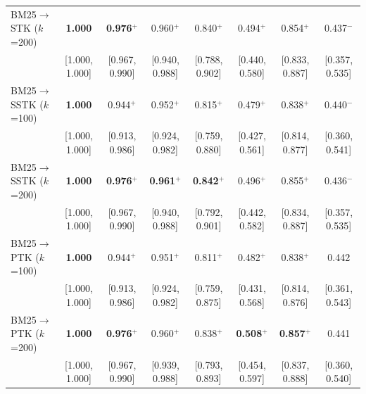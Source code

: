 \begin{table}[!htbp]
\begin{tabular}{lccccccc}
\quad BM25$\rightarrow$STK ($k$=200) & \textbf{1.000} & \textbf{0.976}$^{+}$ & 0.960$^{+}$ & 0.840$^{+}$ & 0.494$^{+}$ & 0.854$^{+}$ & 0.437$^{-}$ \\
 & [1.000, 1.000] & [0.967, 0.990] & [0.940, 0.988] & [0.788, 0.902] & [0.440, 0.580] & [0.833, 0.887] & [0.357, 0.535] \\[2pt]
\quad BM25$\rightarrow$SSTK ($k$=100) & \textbf{1.000} & 0.944$^{+}$ & 0.952$^{+}$ & 0.815$^{+}$ & 0.479$^{+}$ & 0.838$^{+}$ & 0.440$^{-}$ \\
 & [1.000, 1.000] & [0.913, 0.986] & [0.924, 0.982] & [0.759, 0.880] & [0.427, 0.561] & [0.814, 0.877] & [0.360, 0.541] \\[2pt]
\quad BM25$\rightarrow$SSTK ($k$=200) & \textbf{1.000} & \textbf{0.976}$^{+}$ & \textbf{0.961}$^{+}$ & \textbf{0.842}$^{+}$ & 0.496$^{+}$ & 0.855$^{+}$ & 0.436$^{-}$ \\
 & [1.000, 1.000] & [0.967, 0.990] & [0.940, 0.988] & [0.792, 0.901] & [0.442, 0.582] & [0.834, 0.887] & [0.357, 0.535] \\[2pt]
\quad BM25$\rightarrow$PTK ($k$=100) & \textbf{1.000} & 0.944$^{+}$ & 0.951$^{+}$ & 0.811$^{+}$ & 0.482$^{+}$ & 0.838$^{+}$ & 0.442 \\
 & [1.000, 1.000] & [0.913, 0.986] & [0.924, 0.982] & [0.759, 0.875] & [0.431, 0.568] & [0.814, 0.876] & [0.361, 0.543] \\[2pt]
\quad BM25$\rightarrow$PTK ($k$=200) & \textbf{1.000} & \textbf{0.976}$^{+}$ & 0.960$^{+}$ & 0.838$^{+}$ & \textbf{0.508}$^{+}$ & \textbf{0.857}$^{+}$ & 0.441 \\
 & [1.000, 1.000] & [0.967, 0.990] & [0.939, 0.988] & [0.793, 0.893] & [0.454, 0.597] & [0.837, 0.888] & [0.360, 0.540] \\[2pt]
\bottomrule
\end{tabular}
\end{table}
